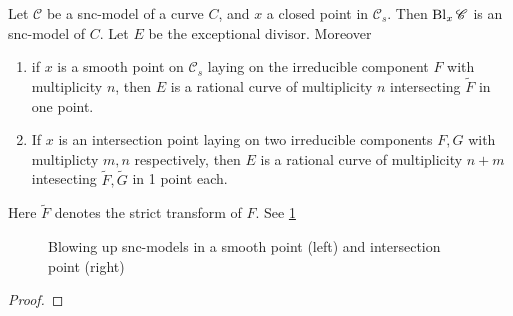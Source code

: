 \begin{lemma}\label{lem:blowup_snc}
	Let $\mathscr C$ be a snc-model of a curve $C$, and $x$ a closed point in $\mathscr C_s$. 
	Then $\operatorname{Bl}_x\mathscr C$ is an snc-model of $C$. Let $E$ be the exceptional divisor. 
	Moreover 
	\begin{enumerate}
		\item if $x$ is a smooth point on $\mathscr C_s$ laying on the irreducible component $F$ with multiplicity $n$, then $E$ is a rational curve of multiplicity $n$ intersecting $\tilde F$ in one point. 
		\item If $x$ is an intersection point laying on two irreducible components $F, G$ with multiplicty  $m, n$ respectively, then $E$ is a rational curve of multiplicity $n + m$ intesecting $\tilde F, \tilde G$ in 1 point each. 
	\end{enumerate}
	Here $\tilde F$ denotes the strict transform of $F$. 
	See \cref{fig:blowup-snc}
\end{lemma}
\begin{figure}[ht]
    \centering
    \caption{Blowing up snc-models in a smooth point (left) and intersection point (right)}
    \label{fig:blowup-snc}
\end{figure}
\begin{proof}
\end{proof}



